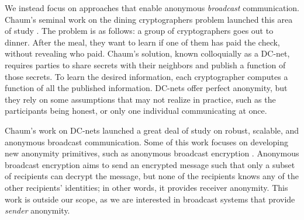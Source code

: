 \documentclass[10pt, twocolumn]{article}
\begin{document}
We instead focus on approaches that enable anonymous \emph{broadcast} communication.
Chaum's seminal work on the dining cryptographers problem launched this area of study \cite{chaum88}.
The problem is as follows: a group of cryptographers goes out to dinner. After the meal, they want to learn if one of them has paid the check, without revealing who paid.
Chaum's solution, known colloquially as a DC-net, requires parties to share secrets with their neighbors and publish a function of those secrets. %
To learn the desired information, each cryptographer computes a function of all the published information. %
DC-nets offer perfect anonymity, but they rely on some assumptions that may not realize in practice, such as the participants being honest, or only one individual communicating at once.

Chaum's work on DC-nets launched a great deal of study on robust, scalable, and anonymous broadcast communication. 
Some of this work focuses on developing new anonymity primitives, such as anonymous broadcast encryption \cite{libert2012anonymous, fazio2012outsider}.
Anonymous broadcast encryption aims to send an encrypted message such that only a subset of recipients can decrypt the message, but none of the recipients knows any of the other recipients' identities; in other words, it provides receiver anonymity.
This work is outside our scope, as we are interested in broadcast systems that provide \emph{sender} anonymity.
\end{document}

